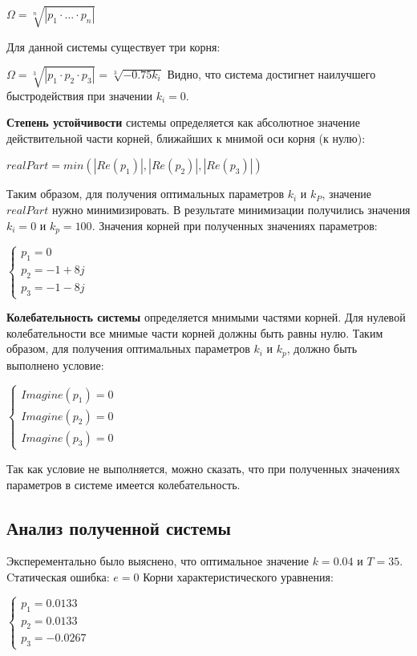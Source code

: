 $\Omega=\sqrt[n]{|p_1\cdot...\cdot p_n|}$


Для данной системы существует три корня:

$\Omega=\sqrt[3]{|p_1\cdot p_2\cdot p_3|}=\sqrt[3]{-0.75k_i}$
Видно, что система достигнет наилучшего быстродействия при значении $k_i = 0$.

\textbf{Степень устойчивости} системы определяется как абсолютное значение действительной части корней, ближайших к мнимой оси корня (к нулю):

$realPart = min(|Re(p_1)|, |Re(p_2)|, |Re(p_3)|)$

Таким образом, для получения оптимальных параметров $k_i$ и $k_P$, значение $realPart$ нужно минимизировать. В результате минимизации получились значения $k_i = 0$ и $k_p = 100$. 
Значения корней при полученных значениях параметров:

$\begin{cases}
 p_1 = 0\\p_2 = -1 + 8j\\ p_3 = -1 -8j 
 \end{cases}
 $

\textbf{Колебательность системы} определяется мнимыми частями корней. Для нулевой колебательности все мнимые части корней должны быть равны нулю.
Таким образом, для получения оптимальных параметров $k_i$ и $k_p$, должно быть выполнено условие:

$\begin{cases}
Imagine(p_1)=0\\Imagine(p_2)=0\\Imagine(p_3)=0
\end{cases}
$

Так как условие не выполняется, можно сказать, что при полученных значениях параметров
в системе имеется колебательность.



\subsection{Анализ полученной системы}


Эксперементально было выяснено, что оптимальное значение  $k = 0.04$ и $T = 35$.
Cтатическая ошибка: $e = 0$ 
Корни характеристического уравнения:

$\begin{cases}
 p_1 = 0.0133\\p_2 =0.0133\\ p_3 =-0.0267
 \end{cases}
 $
 

